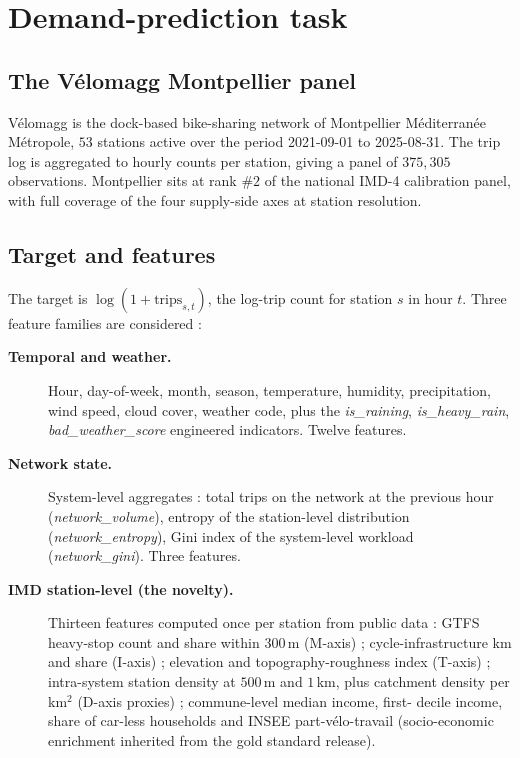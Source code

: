 \documentclass[11pt,a4paper]{article}
\begin{document}
\section{Demand-prediction task}
\label{sec:task}

\subsection{The V\'elomagg Montpellier panel}

V\'elomagg is the dock-based bike-sharing network of Montpellier
M\'editerran\'ee M\'etropole, $53$ stations active over the
period 2021-09-01 to 2025-08-31.  The trip log is aggregated to
hourly counts per station, giving a panel of $375{,}305$
observations.  Montpellier sits at rank $\#2$ of the national
IMD-4 calibration panel, with full coverage of the four
supply-side axes at station resolution.

\subsection{Target and features}

The target is $\log(1 + \text{trips}_{s,t})$, the log-trip count
for station $s$ in hour $t$.  Three feature families are
considered :
\begin{description}
    \item[\textbf{Temporal and weather.}]  Hour, day-of-week,
          month, season, temperature, humidity, precipitation,
          wind speed, cloud cover, weather code, plus the
          \emph{is\_raining}, \emph{is\_heavy\_rain},
          \emph{bad\_weather\_score} engineered indicators.
          Twelve features.

    \item[\textbf{Network state.}]  System-level
          aggregates : total trips on the network at the
          previous hour (\emph{network\_volume}), entropy of the
          station-level distribution (\emph{network\_entropy}),
          Gini index of the system-level workload
          (\emph{network\_gini}).  Three features.

    \item[\textbf{IMD station-level (the novelty).}]  Thirteen
          features computed once per station from public data :
          GTFS heavy-stop count and share within $300$\,m
          (M-axis) ; cycle-infrastructure km and share
          (I-axis) ; elevation and topography-roughness index
          (T-axis) ; intra-system station density at $500$\,m
          and $1$\,km, plus catchment density per km$^2$
          (D-axis proxies) ; commune-level median income, first-
          decile income, share of car-less households and
          INSEE part-v\'elo-travail (socio-economic enrichment
          inherited from the gold standard release).
\end{description}
\end{document}
